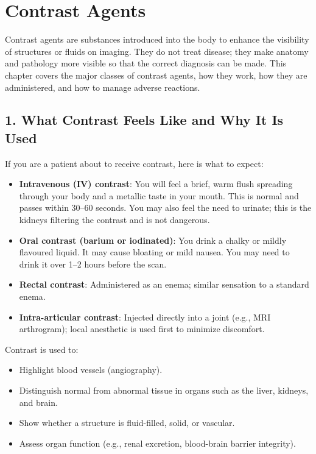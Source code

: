 \chapter{Contrast Agents}

\label{ch:ch06_contrast_agents}

Contrast agents are substances introduced into the body to enhance the visibility of structures or fluids on imaging. They do not treat disease; they make anatomy and pathology more visible so that the correct diagnosis can be made. This chapter covers the major classes of contrast agents, how they work, how they are administered, and how to manage adverse reactions.


\section*{1. What Contrast Feels Like and Why It Is Used}
If you are a patient about to receive contrast, here is what to expect:
\begin{itemize}
    \item \textbf{Intravenous (IV) contrast}: You will feel a brief, warm flush spreading through your body and a metallic taste in your mouth. This is normal and passes within 30--60 seconds. You may also feel the need to urinate; this is the kidneys filtering the contrast and is not dangerous.
    \item \textbf{Oral contrast (barium or iodinated)}: You drink a chalky or mildly flavoured liquid. It may cause bloating or mild nausea. You may need to drink it over 1--2 hours before the scan.
    \item \textbf{Rectal contrast}: Administered as an enema; similar sensation to a standard enema.
    \item \textbf{Intra-articular contrast}: Injected directly into a joint (e.g., MRI arthrogram); local anesthetic is used first to minimize discomfort.
\end{itemize}

Contrast is used to:
\begin{itemize}
    \item Highlight blood vessels (angiography).
    \item Distinguish normal from abnormal tissue in organs such as the liver, kidneys, and brain.
    \item Show whether a structure is fluid-filled, solid, or vascular.
    \item Assess organ function (e.g., renal excretion, blood-brain barrier integrity).
\end{itemize}


